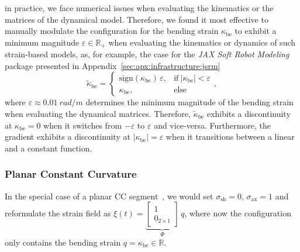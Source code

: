 in practice, we face numerical issues when evaluating the kinematics or the matrices of the dynamical model.
Therefore, we found it most effective to manually modulate the configuration for the bending strain $\kappa_\mathrm{be}$ to exhibit a minimum magnitude $\varepsilon \in \mathbb{R}_+$ when evaluating the kinematics or dynamics of such strain-based models, as, for example, the case for the \emph{JAX Soft Robot Modeling} package presented in Appendix~\ref{sec:apx:infrastructure:jsrm}
\begin{equation}
    \tilde{\kappa}_\mathrm{be} = \begin{cases}
        \mathrm{sign}(\kappa_\mathrm{be}) \, \varepsilon, & \text{if} \: |\kappa_\mathrm{be}| < \varepsilon\\
        \kappa_\mathrm{be}, & \text{else}
    \end{cases},
\end{equation}
where $\varepsilon \approx \SI{0.01}{rad \per m}$ determines the minimum magnitude of the bending strain when evaluating the dynamical matrices.
Therefore, $\tilde{\kappa}_\mathrm{be}$ exhibits a discontinuity at $\kappa_\mathrm{be} = 0$ when it switches from $-\varepsilon$ to $\varepsilon$ and vice-versa. Furthermore, the gradient exhibits a discontinuity at $|\kappa_\mathrm{be}| = \varepsilon$ when it transitions between a linear and a constant function.

\subsubsection{Planar Constant Curvature}
In the special case of a planar \gls{CC} segment~\citep{webster2010design, della2023model}, we would set $\sigma_\mathrm{sh} = 0$, $\sigma_\mathrm{ax} = 1$ and reformulate the strain field as $\xi(t) = \underbrace{\begin{bmatrix}
    1\\ 0_{2 \times 1}
\end{bmatrix}}_{\Phi} \, q$, where now the configuration only contains the bending strain $q = \kappa_\mathrm{be} \in \mathbb{R}$.


